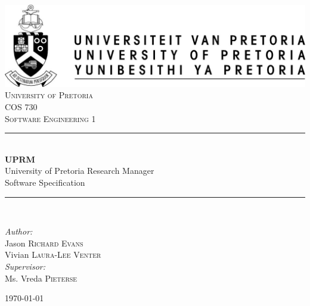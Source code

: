 \documentclass[12pt]{article}
\begin{document}
	\begin{titlepage}
		\newcommand{\HRule}{\rule{\linewidth}{0.5mm}}
		\center
		
		\includegraphics{up-logo.jpg} \\[1cm]
		
		\textsc{\LARGE University of Pretoria}\\[1.5cm]
		\textsc{\Large COS 730}\\[0.5cm]
		\textsc{\large Software Engineering 1}\\[0.5cm]

		\HRule \\[0.4cm]
		{ \huge \bfseries UPRM}\\[0.4cm]
		{\large University of Pretoria Research Manager}\\
		{Software Specification}\\
		\HRule \\[1.5cm]
		
		\begin{minipage}{0.6\textwidth}
			\begin{flushleft} \large
				\emph{Author:}\\
				Jason \textsc{Richard Evans}\\
				Vivian \textsc{Laura-Lee Venter} \\[1cm]
				\emph{Supervisor:} \\
				Ms. Vreda \textsc{Pieterse}\\
			\end{flushleft}
		\end{minipage}
		
		\vfill
		{\large \today}\\[6cm]
		\vfill	
	\end{titlepage}
\end{document}
